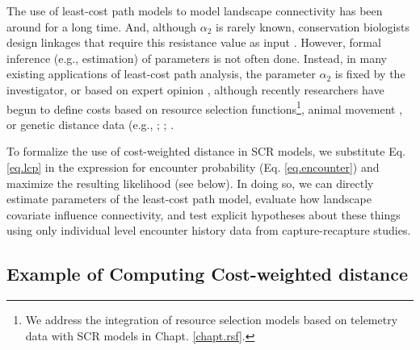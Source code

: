 The use of least-cost path models to model landscape connectivity has
been around for a long time. And, although $\alpha_{2}$ is rarely
known, conservation biologists design linkages that require this
resistance value as input \citep[see][and articles cited
therein]{beier_etal:2008}.  However, formal inference (e.g.,
estimation) of parameters is not often done.  Instead, in many
existing applications of least-cost path analysis, the parameter
$\alpha_{2}$ is fixed by the investigator, or based on expert opinion
\citep{beier_etal:2008}, although recently researchers have begun to
define costs based on resource selection functions\footnote{We address the integration of resource
selection models based on telemetry data with SCR models in
Chapt. \ref{chapt.rsf}.},
animal movement
\citep{tracy:2006, fortin_etal:2005}, or genetic distance data (e.g.,
\citet{gerlach_musolf:2000}; \citet{epps_etal:2007};
\citet{schwartz_etal:2009}.


To formalize the use of cost-weighted distance in SCR models, we
substitute Eq. \ref{eq.lcp} in the expression for encounter
probability (Eq. \ref{eq.encounter}) and maximize the resulting
likelihood (see  below). In doing so, we can directly
estimate parameters of the least-cost path model, evaluate how
landscape covariate influence connectivity, and test explicit hypotheses
about these things using only individual level encounter history data
from capture-recapture studies.


\subsection{Example of Computing Cost-weighted distance}

